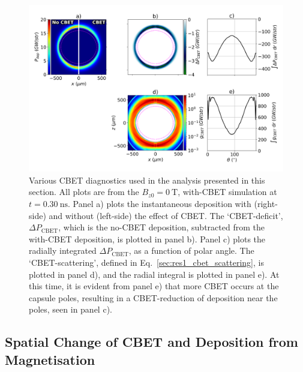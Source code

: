 \begin{figure}[t!]
    \includegraphics[width=\linewidth]{Results2/Images/magcbet_analysis.png}
    \centering
    \caption{Various \ac{CBET} diagnostics used in the analysis presented in this section.
    All plots are from the $B_{z0}=0\ \text{T}$, with-\ac{CBET} simulation at $t=0.30\ \text{ns}$.
    Panel a) plots the instantaneous deposition with (right-side) and without (left-side) the effect of \ac{CBET}.
    The `\ac{CBET}-deficit', $\Delta P_{\text{CBET}}$, which is the no-\ac{CBET} deposition, subtracted from the with-\ac{CBET} deposition, is plotted in panel b).
    Panel c) plots the radially integrated $\Delta P_{\text{CBET}}$, as a function of polar angle.
    The `\ac{CBET}-scattering', defined in Eq.~\ref{sec:res1_cbet_scattering}, is plotted in panel d), and the radial integral is plotted in panel e).
    At this time, it is evident from panel e) that more \ac{CBET} occurs at the capsule poles, resulting in a \ac{CBET}-reduction of deposition near the poles, seen in panel c).}%
    \label{fig:Res2_magcbet_analysis}
\end{figure}


\subsection{Spatial Change of CBET and Deposition from Magnetisation}%
\label{sec:Res2_mag_on_cbet_change}

